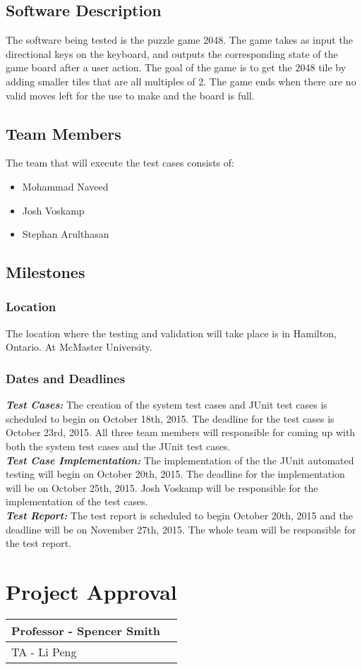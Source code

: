 \documentclass[12pt]{article}
\begin{document}
\subsection{Software Description}
The software being tested is the puzzle game 2048. The game takes as input the 
directional keys on the keyboard, and outputs the corresponding state of the 
game board after a user action. The goal of the game is to get the 2048 tile by 
adding smaller tiles that are all multiples of 2. The game ends when there are 
no valid moves left for the use to make and the board is full. 

\subsection{Team Members}
The team that will execute the test cases consists of:

\begin{itemize}
	\item Mohammad Naveed
	\item Josh Voskamp
	\item Stephan Arulthasan
\end{itemize}

\subsection{Milestones}

\subsubsection{Location}
The location where the testing and validation will take place is in Hamilton, 
Ontario. At McMaster University.

\subsubsection{Dates and Deadlines}
\textbf{\emph{Test Cases:}}
The creation of the system test cases and JUnit test cases is scheduled to 
begin on October 18th, 2015. The deadline for the test cases is October 23rd, 
2015. All three team members will responsible for coming up with both the 
system test cases and the JUnit test cases.\\
\textbf{\emph{Test Case Implementation:}}
The implementation of the the JUnit automated testing will begin on October 
20th, 2015. The deadline for the implementation will be on October 25th, 2015. 
Josh Voskamp will be responsible for the implementation of the test cases.\\
\textbf{\emph{Test Report:}}
The test report is scheduled to begin October 20th, 2015 and the deadline will 
be on November 27th, 2015. The whole team will be responsible for the test 
report.

\section{Project Approval}

\begin{center}
	\begin{tabular}{ | p{5cm} | p{5cm} |}
		\hline
		Professor - Spencer Smith &  \\ \hline
		TA - Li Peng &  \\ \hline
	\end{tabular}
\end{center}
\end{document}
